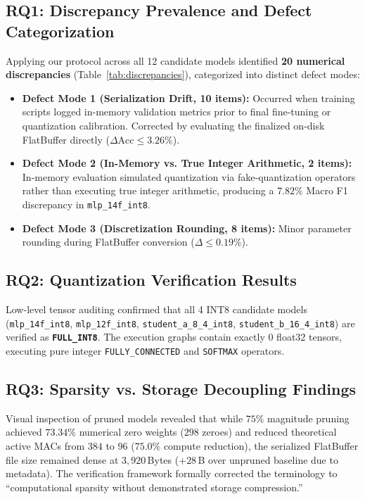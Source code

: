 \documentclass[journal]{IEEEtran}
\begin{document}
\subsection{RQ1: Discrepancy Prevalence and Defect Categorization}
Applying our protocol across all 12 candidate models identified \textbf{20 numerical discrepancies} (Table~\ref{tab:discrepancies}), categorized into distinct defect modes:
\begin{itemize}
    \item \textbf{Defect Mode 1 (Serialization Drift, 10 items):} Occurred when training scripts logged in-memory validation metrics prior to final fine-tuning or quantization calibration. Corrected by evaluating the finalized on-disk FlatBuffer directly ($\Delta \text{Acc} \le 3.26\%$).
    \item \textbf{Defect Mode 2 (In-Memory vs. True Integer Arithmetic, 2 items):} In-memory evaluation simulated quantization via fake-quantization operators rather than executing true integer arithmetic, producing a $7.82\%$ Macro F1 discrepancy in \texttt{mlp\_14f\_int8}.
    \item \textbf{Defect Mode 3 (Discretization Rounding, 8 items):} Minor parameter rounding during FlatBuffer conversion ($\Delta \le 0.19\%$).
\end{itemize}

\subsection{RQ2: Quantization Verification Results}
Low-level tensor auditing confirmed that all 4 INT8 candidate models (\texttt{mlp\_14f\_int8}, \texttt{mlp\_12f\_int8}, \texttt{student\_a\_8\_4\_int8}, \texttt{student\_b\_16\_4\_int8}) are verified as \textbf{\texttt{FULL\_INT8}}. The execution graphs contain exactly $0$ float32 tensors, executing pure integer \texttt{FULLY\_CONNECTED} and \texttt{SOFTMAX} operators.

\subsection{RQ3: Sparsity vs. Storage Decoupling Findings}
Visual inspection of pruned models revealed that while $75\%$ magnitude pruning achieved $73.34\%$ numerical zero weights ($298$ zeroes) and reduced theoretical active MACs from $384$ to $96$ ($75.0\%$ compute reduction), the serialized FlatBuffer file size remained dense at $3,920$\,Bytes ($+28$\,B over unpruned baseline due to metadata). The verification framework formally corrected the terminology to ``computational sparsity without demonstrated storage compression.''
\end{document}
